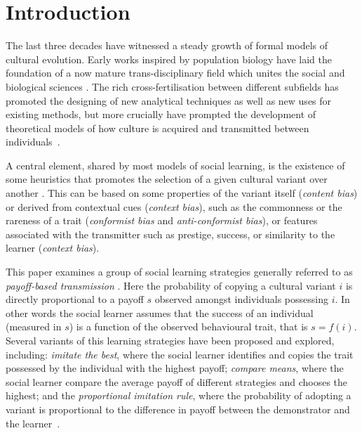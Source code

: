 \documentclass[review,authoryear]{elsarticle}
\begin{document}
\section{Introduction}

The last three decades have witnessed a steady growth of formal models of cultural evolution. Early works inspired by population biology \citep{cavallisforza_feldman_1981,boyd1985} have laid the foundation of a now mature trans-disciplinary field which unites the social and biological sciences \citep{mesoudi_etal_2006}. The rich cross-fertilisation between different subfields has promoted the designing of new analytical techniques as well as new uses for existing methods, but more crucially have prompted the development of theoretical models of how culture is acquired and transmitted between individuals~\citep{mesoudi_cultural_2015}.

A central element, shared by most models of social learning, is the existence of some heuristics that promotes the selection of a given cultural variant over another \citep{laland2004}. This can be based on some properties of the variant itself (\emph{content bias}) or derived from contextual cues (\emph{context bias}), such as the commonness or the rareness of a trait (\emph{conformist bias} and \emph{anti-conformist bias}), or  features associated with the transmitter such as prestige, success, or similarity to the learner (\emph{context bias})\citep{henrich_mcelreath2003}. 

This paper examines a group of social learning strategies generally referred to as \emph{payoff-based transmission} \citep{schlag1998,kendal_etal_2009,lake_and_crema_2012,baldini2013,kandler_and_laland_2013,crema_lake_inpress}. Here the probability of copying a cultural variant $i$ is directly proportional to a payoff $s$ observed amongst individuals possessing $i$. In other words the social learner assumes that the success of an individual (measured in $s$) is a function of the observed behavioural trait, that is $s=f(i)$. Several variants of this learning strategies have been proposed and explored, including: \emph{imitate the best}, where the social learner identifies and copies the trait possessed by the individual with the highest payoff; \emph{compare means}, where the social learner compare the average payoff of different strategies and chooses the highest; and the \emph{proportional imitation rule}, where the probability of adopting a variant is proportional to the difference in payoff between the demonstrator and the learner~\citep{schlag1998,baldini2013,crema_lake_inpress}. 
\end{document}
